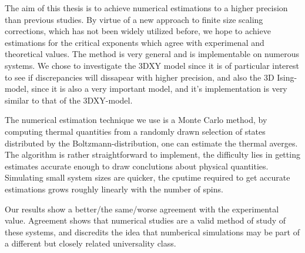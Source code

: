 The aim of this thesis is to achieve numerical estimations to a higher precision than previous studies. By virtue of a new approach to finite size scaling corrections, which has not been widely utilized before, we hope to achieve estimations for the critical exponents which agree with experimenal and theoretical values. The method is very general and is implementable on numerous systems. We chose to investigate the 3DXY model since it is of  particular interest to see if discrepancies will dissapear with higher precision, and also the 3D Ising-model, since it is also a very important model, and it's implementation is very similar to that of the 3DXY-model.

The numerical estimation technique we use is a Monte Carlo method, by computing thermal quantities from a randomly drawn selection of states distributed by the Boltzmann-distribution, one can estimate the thermal averges. The algorithm is rather straightforward to implement, the difficulty lies in getting estimates accurate enough to draw conclutions about physical quantities. Simulating small system sizes are quicker, the cputime required to get accurate estimations grows roughly linearly with the number of spins.

Our results show a better/the same/worse agreement with the experimental value. Agreement shows that numerical studies are a valid method of study of these systems, and discredits the idea that numberical simulations may be part of a different but closely related universality class.


